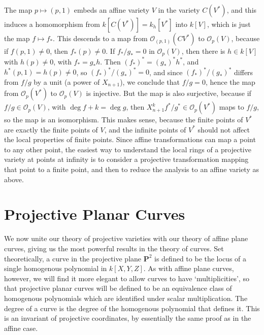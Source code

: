The map $p \mapsto (p,1)$ embeds an affine variety $V$ in the variety $C(V^*)$, and this induces a homomorphism from $k[C(V^*)] = k_h[V^*]$ into $k[V]$, which is just the map $f \mapsto f_*$. This descends to a map from $\mathcal{O}_{(p,1)}(CV^*)$ to $\mathcal{O}_p(V)$, because if $f(p,1) \neq 0$, then $f_*(p) \neq 0$. If $f_*/g_* = 0$ in $\mathcal{O}_p(V)$, then there is $h \in k[V]$ with $h(p) \neq 0$, with $f_* = g_* h$. Then $(f_*)^* = (g_*)^* h^*$, and $h^*(p,1) = h(p) \neq 0$, so $(f_*)^*/(g_*)^* = 0$, and since $(f_*)^*/(g_*)^*$ differs from $f/g$ by a unit (a power of $X_{n+1}$), we conclude that $f/g = 0$, hence the map from $\mathcal{O}_p(V^*)$ to $\mathcal{O}_p(V)$ is injective. But the map is also surjective, because if $f/g \in \mathcal{O}_p(V)$, with $\deg f + k = \deg g$, then $X_{n+1}^k f^*/g^* \in \mathcal{O}_p(V^*)$ maps to $f/g$, so the map is an isomorphism. This makes sense, because the finite points of $V^*$ are exactly the finite points of $V$, and the infinite points of $V^*$ should not affect the local properties of finite points. Since affine transformations can map a point to any other point, the easiest way to understand the local rings of a projective variety at points at infinity is to consider a projective transformation mapping that point to a finite point, and then to reduce the analysis to an affine variety as above.

\chapter{Projective Planar Curves}

We now unite our theory of projective varieties with our theory of affine plane curves, giving us the most powerful results in the theory of curves. Set theoretically, a curve in the projective plane $\mathbf{P}^2$ is defined to be the locus of a single homogenous polynomial in $k[X,Y,Z]$. As with affine plane curves, however, we will find it more elegant to allow curves to have `multiplicities', so that projective planar curves will be defined to be an equivalence class of homogenous polynomials which are identified under scalar multiplication. The degree of a curve is the degree of the homogenous polynomial that defines it. This is an invariant of projective coordinates, by essentially the same proof as in the affine case.

